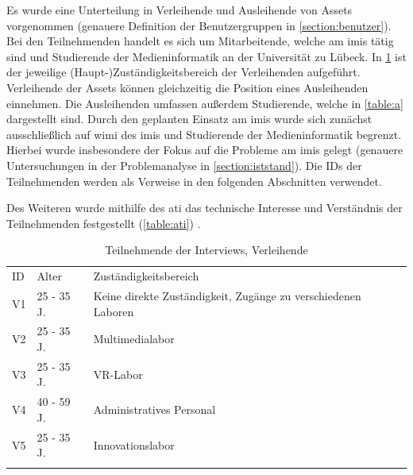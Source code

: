 Es wurde eine Unterteilung in Verleihende und Ausleihende von Assets vorgenommen (genauere
Definition der Benutzergruppen in \ref{section:benutzer}). Bei den Teilnehmenden handelt es sich um
Mitarbeitende, welche am \ac{imis} tätig sind und Studierende der Medieninformatik an der
Universität zu Lübeck. In \ref{table:v} ist der jeweilige (Haupt-)Zuständigkeitsbereich der
Verleihenden aufgeführt. Verleihende der Assets können gleichzeitig die Position eines Ausleihenden
einnehmen. Die Ausleihenden umfassen außerdem Studierende, welche in \ref{table:a} dargestellt sind.
Durch den geplanten Einsatz am \ac{imis} wurde sich zunächst ausschließlich auf \ac{wimi} des
\ac{imis} und Studierende der Medieninformatik begrenzt. Hierbei wurde insbesondere der Fokus auf
die Probleme am \ac{imis} gelegt (genauere Untersuchungen in der Problemanalyse in
\ref{section:iststand}). Die IDs der Teilnehmenden werden als Verweise in den folgenden Abschnitten
verwendet.

Des Weiteren wurde mithilfe des \ac{ati} das technische Interesse und Verständnis der Teilnehmenden
festgestellt (\ref{table:ati}) \cite{attig_assessing_2017}.

\begin{table}[h]
        \centering
        \caption{Teilnehmende der Interviews, Verleihende}
        \begin{tabular}{lll}
                \arrayrulecolor{maincolor}\hline
                \sffamily\color{maincolor}ID & \sffamily\color{maincolor}Alter &
                \sffamily\color{maincolor}Zuständigkeitsbereich                                   \\
                \arrayrulecolor{maincolor}\hline
                V1                           & 25 - 35 J.                      & Keine direkte
                Zuständigkeit, Zugänge zu verschiedenen Laboren                                   \\
                V2                           & 25 - 35 J.                      & Multimedialabor
                \\
                V3                           & 25 - 35 J.                      & VR-Labor
                \\
                V4                           & 40 - 59 J.                      & Administratives
                Personal                                                                          \\
                V5                           & 25 - 35 J.                      & Innovationslabor
                \\
                \arrayrulecolor{maincolor}\hline
        \end{tabular}
        \label{table:v}
\end{table}

